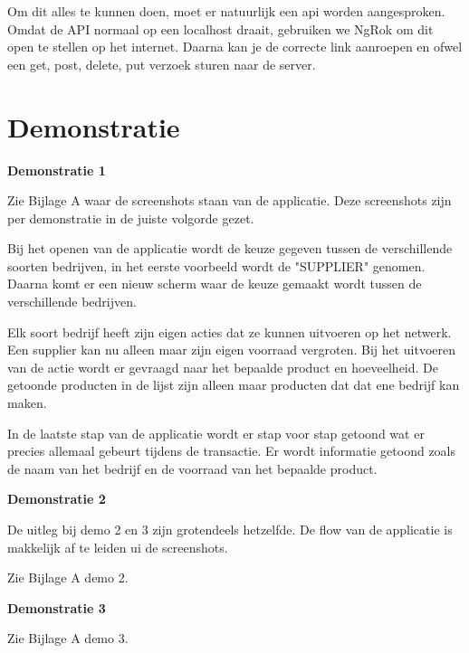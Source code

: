 \documentclass[fleqn,a4paper,12pt]{book}
\begin{document}
Om dit alles te kunnen doen, moet er natuurlijk een api worden aangesproken. Omdat de API normaal op een localhost draait, gebruiken we NgRok om dit open te stellen op het internet. Daarna kan je de correcte link aanroepen en ofwel een get, post, delete, put verzoek sturen naar de server.

\section{Demonstratie}

\textbf{Demonstratie 1}

Zie Bijlage A waar de screenshots staan van de applicatie. Deze screenshots zijn per demonstratie in de juiste volgorde gezet.

Bij het openen van de applicatie wordt de keuze gegeven tussen de verschillende soorten bedrijven, in het eerste voorbeeld wordt de "SUPPLIER" genomen. Daarna komt er een nieuw scherm waar de keuze gemaakt wordt tussen de verschillende bedrijven.

Elk soort bedrijf heeft zijn eigen acties dat ze kunnen uitvoeren op het netwerk. Een supplier kan nu alleen maar zijn eigen voorraad vergroten. Bij het uitvoeren van de actie wordt er gevraagd naar het bepaalde product en hoeveelheid. De getoonde producten in de lijst zijn alleen maar producten dat dat ene bedrijf kan maken.

In de laatste stap van de applicatie wordt er stap voor stap getoond wat er precies allemaal gebeurt tijdens de transactie. Er wordt informatie getoond zoals de naam van het bedrijf en de voorraad van het bepaalde product.


\textbf{Demonstratie 2}

De uitleg bij demo 2 en 3 zijn grotendeels hetzelfde. De flow van de applicatie is makkelijk af te leiden ui de screenshots.

Zie Bijlage A demo 2.

\textbf{Demonstratie 3}

Zie Bijlage A demo 3.
\end{document}
